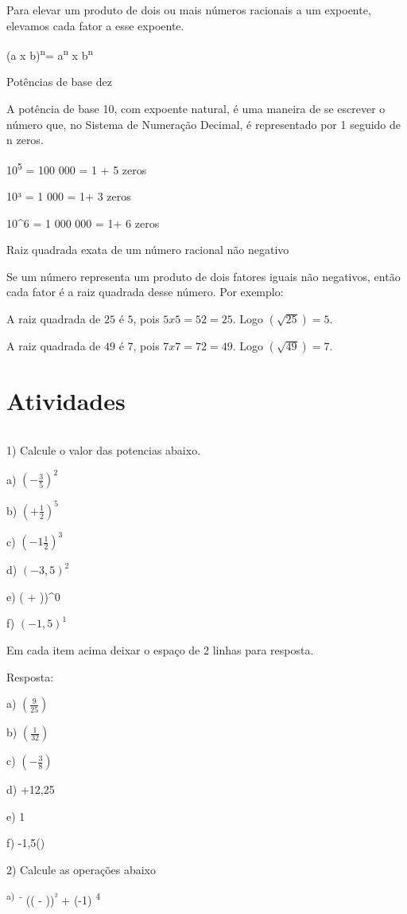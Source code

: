 Para elevar um produto de dois ou mais números racionais a um expoente,
elevamos cada fator a esse expoente.

(a x b)\textsuperscript{n}= a\textsuperscript{n} x b\textsuperscript{n}

Potências de base dez

A potência de base 10, com expoente natural, é uma maneira de se
escrever o número que, no Sistema de Numeração Decimal, é representado
por 1 seguido de n zeros.

10\textsuperscript{5} = 100 000 = 1 + 5 zeros

10³ = 1 000 = 1+ 3 zeros

10^{6} = 1 000 000 = 1+ 6 zeros

Raiz quadrada exata de um número racional não negativo

Se um número representa um produto de dois fatores iguais não negativos,
então cada fator é a raiz quadrada desse número. Por exemplo:

A raiz quadrada de $25$ é $5$, pois $5 x 5 = 52 = 25$. Logo $(\sqrt{25}) = 5$.

A raiz quadrada de $49$ é $7$, pois $7 x 7 = 72 = 49$. Logo $(\sqrt{49}) = 7$.

\section{Atividades}

\[\ \]

1) Calcule o valor das potencias abaixo.

a) $(-\frac{3}{5})^{2}$

b) $( + \frac{1}{2})^{5}$

c) $( - 1\frac{1}{2})^{3}$

d) $(-3,5)^2$

e) ( + ))^{0}


f) $(-1,5)^1$

Em cada item acima deixar o espaço de 2 linhas para resposta.

Resposta:

a) $(\frac{9}{25})$

b) $(\frac{1}{32})$

c) $(-\frac{3}{8})$

d) +12,25

e) 1

f) -1,5()

2) Calcule as operações abaixo

\textsuperscript{a)~-} (( - ))\textsuperscript{²} + (-1)
\textsuperscript{4}



